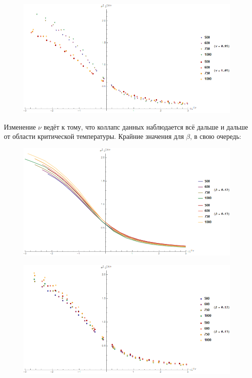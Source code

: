 \begin{figure}[!h]
    \centering
    \includegraphics[width=150mm]{Sections/Images/ErrV2_3.png}
    \label{fig:ErrV2_3}
\end{figure}

Изменение $\nu$ ведёт к тому, что коллапс данных наблюдается всё дальше и дальше от области критической температуры. Крайние значения для $\beta$, в свою очередь:

\begin{figure}[!h]
    \centering
    \includegraphics[width=150mm]{Sections/Images/ErrB2_1.png}
    \label{fig:DatColM2_1}
\end{figure}

\begin{figure}[!h]
    \centering
    \includegraphics[width=150mm]{Sections/Images/ErrB2_2.png}
    \label{fig:DatColM2_2}
\end{figure}

